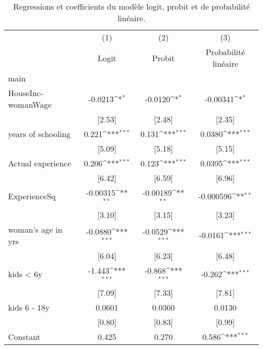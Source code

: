 {
\def\sym#1{\ifmmode^{#1}\else\(^{#1}\)\fi}
\begin{longtable}{l*{3}{c}}
\caption{Regressions et coefficients du modèle logit, probit et de probabilité linéaire.}\\
\hline\hline\endfirsthead\hline\endhead\hline\endfoot\endlastfoot
                    &\multicolumn{1}{c}{(1)}&\multicolumn{1}{c}{(2)}&\multicolumn{1}{c}{(3)}\\
                    &\multicolumn{1}{c}{Logit}&\multicolumn{1}{c}{Probit}&\multicolumn{1}{c}{Probabilité linéaire}\\
\hline
main                &                     &                     &                     \\
HouseInc-womanWage  &     -0.0213\sym{*}  &     -0.0120\sym{*}  &    -0.00341\sym{*}  \\
                    &      [2.53]         &      [2.48]         &      [2.35]         \\
[1em]
years of schooling  &       0.221\sym{***}&       0.131\sym{***}&      0.0380\sym{***}\\
                    &      [5.09]         &      [5.18]         &      [5.15]         \\
[1em]
Actual experience   &       0.206\sym{***}&       0.123\sym{***}&      0.0395\sym{***}\\
                    &      [6.42]         &      [6.59]         &      [6.96]         \\
[1em]
ExperienceSq        &    -0.00315\sym{**} &    -0.00189\sym{**} &   -0.000596\sym{**} \\
                    &      [3.10]         &      [3.15]         &      [3.23]         \\
[1em]
woman's age in yrs  &     -0.0880\sym{***}&     -0.0529\sym{***}&     -0.0161\sym{***}\\
                    &      [6.04]         &      [6.23]         &      [6.48]         \\
[1em]
kids < 6y           &      -1.443\sym{***}&      -0.868\sym{***}&      -0.262\sym{***}\\
                    &      [7.09]         &      [7.33]         &      [7.81]         \\
[1em]
kids 6 - 18y        &      0.0601         &      0.0360         &      0.0130         \\
                    &      [0.80]         &      [0.83]         &      [0.99]         \\
[1em]
Constant            &       0.425         &       0.270         &       0.586\sym{***}\\

\end{longtable}}
